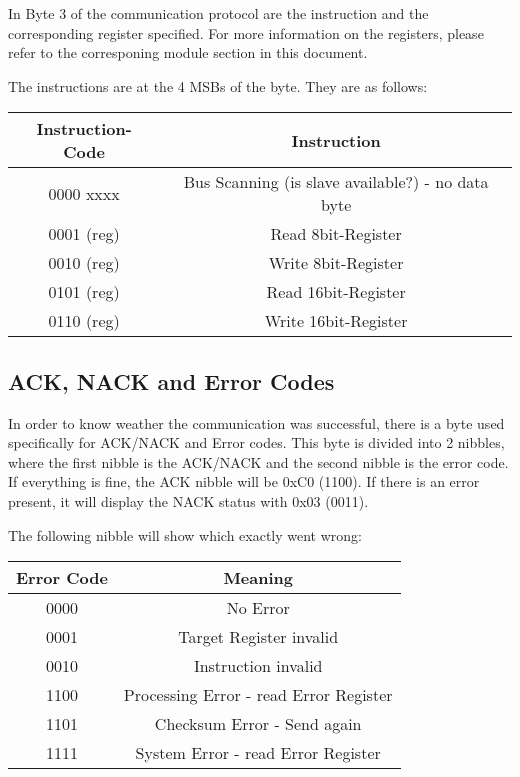 In Byte 3 of the communication protocol are the instruction and the corresponding register specified. For more information on the registers, please refer to the corresponing module section in this document.

The instructions are at the 4 MSBs of the byte. They are as follows:

\begin{table}[H]
    \centering
        \begin{tabular}{|c|c|}
            \hline
            Instruction-Code & Instruction \\ \hline \hline
            0000 xxxx   & Bus Scanning (is slave available?) - no data byte \\ \hline
            0001 (reg)  & Read 8bit-Register\\ \hline
            0010 (reg)  & Write 8bit-Register \\ \hline
            0101 (reg)  & Read 16bit-Register \\ \hline
            0110 (reg)  & Write 16bit-Register \\ \hline
        \end{tabular}
\end{table}

\subsection{ACK, NACK and Error Codes}
In order to know weather the communication was successful, there is a byte used specifically for ACK/NACK and Error codes. This byte is divided into 2 nibbles, where the first nibble is the ACK/NACK and the second nibble is the error code. If everything is fine, the ACK nibble will be 0xC0 (1100). If there is an error present, it will display the NACK status with 0x03 (0011).

The following nibble will show which exactly went wrong:

\begin{table}[H]
    \centering
        \begin{tabular}{|c|c|}
            \hline
            Error Code & Meaning \\ \hline \hline
            0000 & No Error \\ \hline
            0001 & Target Register invalid \\ \hline
            0010 & Instruction invalid \\ \hline
            1100 & Processing Error - read Error Register \\ \hline
            1101 & Checksum Error - Send again \\ \hline
            1111 & System Error - read Error Register \\ \hline
        \end{tabular}
\end{table}